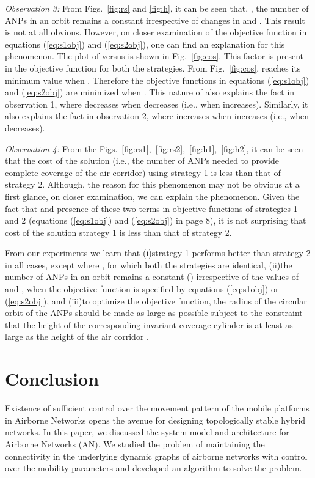 \documentclass[10pt]{IEEEtran}
\begin{document}
\medskip
\noindent
{\em Observation 3: }From Figs.~\ref{fig:rs} and \ref{fig:h}, it can be seen that, , the number of ANPs in an orbit remains a constant irrespective of changes in  and . This result is not at all obvious. However, on closer examination of the objective function in equations (\ref{eq:s1obj}) and (\ref{eq:s2obj}), one can find an explanation for this phenomenon. The plot of  versus  is shown in Fig.~\ref{fig:cos}. This factor is present in the objective function for both the strategies. From Fig.~\ref{fig:cos},  reaches its minimum value when  . Therefore the objective functions in equations (\ref{eq:s1obj}) and (\ref{eq:s2obj}) are minimized when . This nature of  also explains the fact in observation 1, where  decreases when  decreases (i.e., when  increases). Similarly, it also explains the fact in observation 2, where  increases when  increases (i.e., when  decreases).
 
\medskip          
\noindent
 {\em Observation 4: }From the Figs.~\ref{fig:rs1},~\ref{fig:rs2},~\ref{fig:h1},~\ref{fig:h2}, it can be seen that the cost of the solution (i.e., the number of ANPs needed to provide complete coverage of the air corridor) using strategy 1 is less than that of strategy 2. Although, the reason for this phenomenon may not be obvious at a first glance, on closer examination, we can explain the phenomenon.  Given the fact that  and presence of these two terms in objective functions of strategies 1 and 2 (equations (\ref{eq:s1obj}) and (\ref{eq:s2obj}) in page 8), it is not surprising that cost of the solution strategy 1 is less than that of strategy 2.

From our experiments we learn that (i)strategy 1 performs better than strategy 2 in all cases, except where , for which both the strategies are identical, (ii)the number of ANPs in an orbit remains a constant () irrespective of the values of  and , when the objective function is specified  by equations (\ref{eq:s1obj}) or (\ref{eq:s2obj}), and (iii)to optimize the objective function, the radius of the circular orbit of the ANPs should be made as large as possible subject to the constraint that the height of the corresponding invariant coverage cylinder is at least as large as the height of the air corridor .

\section{Conclusion}
\label{sec:conclusion}
\balance Existence of sufficient control over the movement pattern of the mobile platforms in Airborne Networks opens the avenue for designing topologically stable hybrid networks. In this paper, we discussed the system model and architecture for Airborne Networks (AN). We studied the problem of maintaining the connectivity in the underlying dynamic graphs of airborne networks with control over the mobility parameters and developed an algorithm to solve the problem. 
\end{document}
